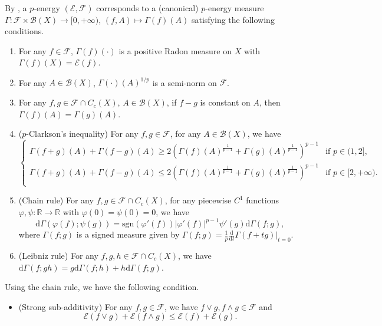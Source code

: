 \documentclass[11pt,a4paper]{article}
\numberwithin{equation}{section}
\theoremstyle{plain}
\theoremstyle{definition}
\begin{document}
By \cite[Theorem 2.4]{Sas26}, a $p$-energy $(\mathcal{E},\mathcal{F})$ corresponds to a (canonical) $p$-energy measure $\Gamma:\mathcal{F}\times\mathcal{B}(X)\to[0,+\infty)$, $(f,A)\mapsto\Gamma(f)(A)$ satisfying the following conditions.
\begin{enumerate}[label=(\alph*),ref=(\alph*)]
\item\label{item_meas1} For any $f\in\mathcal{F}$, $\Gamma(f)(\cdot)$ is a positive Radon measure on $X$ with $\Gamma(f)(X)=\mathcal{E}(f)$.
\item\label{item_meas2} For any $A\in\mathcal{B}(X)$, $\Gamma(\cdot)(A)^{1/p}$ is a semi-norm on $\mathcal{F}$.
\item\label{item_meas3} For any $f,g\in\mathcal{F}\cap C_c(X)$, $A\in\mathcal{B}(X)$, if $f-g$ is constant on $A$, then $\Gamma(f)(A)=\Gamma(g)(A)$.
\item\label{item_meas4} ($p$-Clarkson's inequality) For any $f,g\in\mathcal{F}$, for any $A\in\mathcal{B}(X)$, we have
\begin{equation*}
\begin{cases}
\Gamma(f+g)(A)+\Gamma(f-g)(A)\ge2 \left(\Gamma(f)(A)^{\frac{1}{p-1}}+\Gamma(g)(A)^{\frac{1}{p-1}}\right)^{p-1}&\text{if }p\in(1,2],\\
\Gamma(f+g)(A)+\Gamma(f-g)(A)\le2 \left(\Gamma(f)(A)^{\frac{1}{p-1}}+\Gamma(g)(A)^{\frac{1}{p-1}}\right)^{p-1}&\text{if }p\in[2,+\infty).\\
\end{cases}
\end{equation*}
\item\label{item_meas5} (Chain rule) For any $f,g\in\mathcal{F}\cap C_c(X)$, for any piecewise $C^1$ functions $\varphi,\psi:\mathbb{R}\to\mathbb{R}$ with $\varphi(0)=\psi(0)=0$, we have
$$\mathrm{d}\Gamma\left(\varphi(f);\psi(g)\right)=\mathrm{sgn}(\varphi'(f))|\varphi'(f)|^{p-1}\psi'(g)\mathrm{d}\Gamma(f;g),$$
where $\Gamma(f;g)$ is a signed measure given by $\Gamma(f;g)=\frac{1}{p}\frac{\mathrm{d}}{\mathrm{d}t}\Gamma(f+tg)|_{t=0}$.
\item\label{item_meas6} (Leibniz rule) For any $f,g,h\in \mathcal{F}\cap C_c(X)$, we have $\mathrm{d}\Gamma(f;gh)=g \mathrm{d}\Gamma(f;h)+h \mathrm{d}\Gamma(f;g)$.
\end{enumerate}
Using the chain rule, we have the following condition.
\begin{itemize}
\item (Strong sub-additivity) For any $f,g\in\mathcal{F}$, we have $f\vee g, f\wedge g\in\mathcal{F}$ and
\begin{equation*}\label{eq_SubAdd}\tag*{SubAdd}
\mathcal{E}(f\vee g)+\mathcal{E}(f\wedge g)\le\mathcal{E}(f)+\mathcal{E}(g).
\end{equation*}
\end{itemize}
\end{document}
